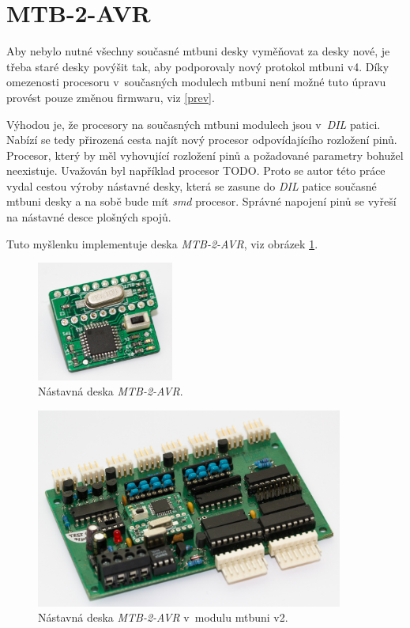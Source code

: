 \newpage
\section{MTB-2-AVR} \label{sec:mtb-2-avr}

Aby nebylo nutné všechny současné \gls{mtbuni} desky vyměňovat za desky nové,
je třeba staré desky povýšit tak, aby podporovaly nový protokol \gls{mtbuni} v4.
Díky omezenosti procesoru v~současných modulech \gls{mtbuni} není možné tuto
úpravu provést pouze změnou firmwaru, viz \ref{prev}.

Výhodou je, že procesory na současných \gls{mtbuni} modulech jsou
v~\textit{DIL} patici. Nabízí se tedy přirozená cesta najít nový procesor
odpovídajícího rozložení pinů. Procesor, který by měl vyhovující rozložení pinů
a požadované parametry bohužel neexistuje. Uvažován byl například procesor
TODO. Proto se autor této práce vydal cestou výroby nástavné desky, která se
zasune do \textit{DIL} patice současné \gls{mtbuni} desky a na sobě bude mít
\textit{smd} procesor.  Správné napojení pinů se vyřeší na nástavné desce
plošných spojů.

Tuto myšlenku implementuje deska \textit{MTB-2-AVR}, viz obrázek
\ref{fig:mtb-2-avr-alone}.

\begin{figure}[ht]
\includegraphics[width=0.4\textwidth]{data/uni-2-upgrade-alone.jpg}
\caption{Nástavná deska \textit{MTB-2-AVR}.}
\label{fig:mtb-2-avr-alone}
\end{figure}

\begin{figure}[ht]
\includegraphics[width=0.9\textwidth]{data/uni-2-upgrade-all.jpg}
\caption{Nástavná deska \textit{MTB-2-AVR} v~modulu \gls{mtbuni} v2.}
\label{fig:mtb-2-avr-inside}
\end{figure}

